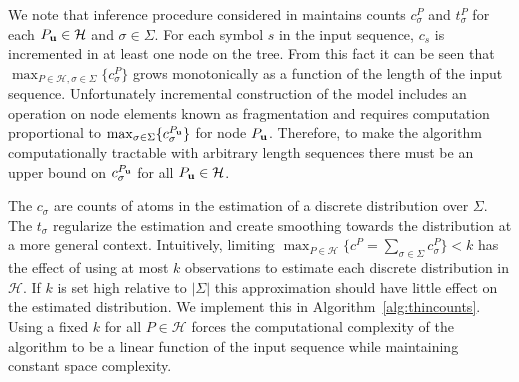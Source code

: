 We note that inference procedure considered in \cite{Gasthaus2011} maintains counts $c^P_\sigma$ and $t^P_\sigma$ for each $P_{\bf u} \in \mathcal{H}$ and $\sigma \in \Sigma$.  For each symbol $s$ in the input sequence, $c_{s}$ is incremented in at least one node on the tree.  From this fact it can be seen that $\max_{P \in \mathcal{H}, \sigma \in \Sigma} \{ c^{P}_{\sigma} \}$ grows monotonically as a function of the length of the input sequence. Unfortunately incremental construction of the model includes an operation on node elements known as fragmentation and requires computation proportional to $\max_{\sigma \in \Sigma} \{ c_{\sigma}^{P_{\bf u}} \}$ for node $P_{\bf u}$\citep{Gasthaus2011}. Therefore, to make the algorithm computationally tractable with arbitrary length sequences there must be an upper bound on $c^{P_{\bf u}}_\sigma$ for all $P_{\bf u} \in \mathcal{H}$.  

The $c_{\sigma}$ are counts of atoms in the estimation of a discrete distribution over $\Sigma$.  The $t_{\sigma}$ regularize the estimation and create smoothing towards the distribution at a more general context.  Intuitively, limiting $\max_{P \in \mathcal{H}} \{ c^{P} =  \sum_{\sigma \in \Sigma} c^{P}_{\sigma} \} < k$  has the effect of using at most $k$ observations to estimate each discrete distribution in $\mathcal{H}$.  If $k$ is set high relative to $|\Sigma|$ this approximation should have little effect on the estimated distribution. We implement this in Algorithm~\ref{alg:thincounts}.  Using a fixed $k$ for all $P \in \mathcal{H}$ forces the computational complexity of the algorithm to be a linear function of the input sequence while maintaining constant space complexity.







